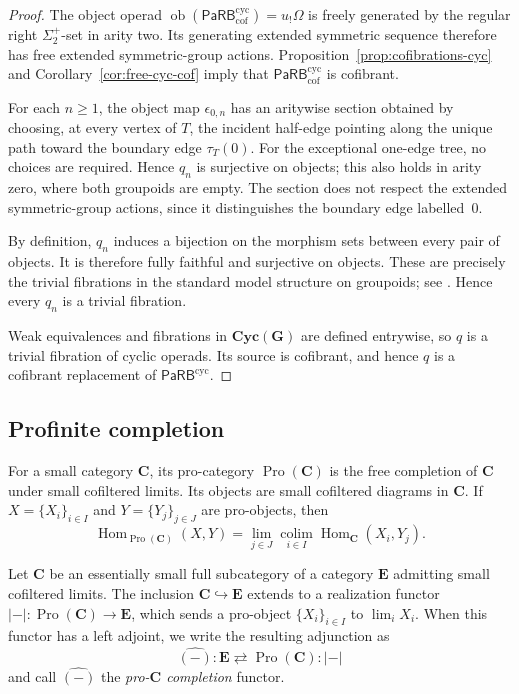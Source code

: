 \documentclass{amsart}
\newcommand{\bC}{\mathbf{C}}
\newcommand{\bE}{\mathbf{E}}
\newcommand{\Grpd}{\mathbf{G}}
\newcommand{\PaRB}{\mathsf{PaRB}}
\newcommand{\magma}{\mathsf{\Omega}}
\newcommand{\Cyc}{\mathbf{Cyc}}
\newcommand{\Pro}{\operatorname{Pro}}
\newcommand{\Hom}{\operatorname{Hom}}
\newcommand{\ob}{\operatorname{ob}}
\theoremstyle{definition}
\numberwithin{equation}{section}
\begin{document}
\begin{proof}
The object operad
$\ob(\PaRB_{\mathrm{cof}}^{\mathrm{cyc}})=u_!\magma$
is freely generated by the regular right $\Sigma_2^+$-set in arity
two. Its generating extended symmetric sequence therefore has free
extended symmetric-group actions.
Proposition~\ref{prop:cofibrations-cyc} and
Corollary~\ref{cor:free-cyc-cof} imply that
$\PaRB_{\mathrm{cof}}^{\mathrm{cyc}}$ is cofibrant.

For each $n\geq1$, the object map $\epsilon_{0,n}$ has an aritywise
section obtained by choosing, at every vertex of $T$, the incident
half-edge pointing along the unique path toward the boundary edge
$\tau_T(0)$. For the exceptional one-edge tree, no choices are
required. Hence $q_n$ is surjective on objects; this also holds in
arity zero, where both groupoids are empty. The section does not
respect the extended symmetric-group actions, since it distinguishes
the boundary edge labelled~$0$.

By definition, $q_n$ induces a bijection on the morphism sets between
every pair of objects. It is therefore fully faithful and surjective
on objects. These are precisely the trivial fibrations in the
standard model structure on groupoids; see
\cite[Section~4]{Horel_profinite_groupoids}. Hence every $q_n$ is a
trivial fibration.

Weak equivalences and fibrations in $\Cyc(\Grpd)$ are defined
entrywise, so $q$ is a trivial fibration of cyclic operads. Its source
is cofibrant, and hence $q$ is a cofibrant replacement of
$\PaRB^{\mathrm{cyc}}$.
\end{proof}
\subsection{Profinite completion}
\label{subsec: Profinite completion}

For a small category $\bC$, its pro-category $\Pro(\bC)$ is the free
completion of $\bC$ under small cofiltered limits. Its objects are
small cofiltered diagrams in $\bC$. If
$X=\{X_i\}_{i\in I}$ and $Y=\{Y_j\}_{j\in J}$ are pro-objects, then
\[
\Hom_{\Pro(\bC)}(X,Y)
=
\lim_{j\in J}\operatorname*{colim}_{i\in I}
\Hom_{\bC}(X_i,Y_j).
\]

Let $\bC$ be an essentially small full subcategory of a category
$\bE$ admitting small cofiltered limits. The inclusion
$\bC\hookrightarrow\bE$ extends to a realization functor
$|-|\colon\Pro(\bC)\to\bE$, which sends a pro-object
$\{X_i\}_{i\in I}$ to $\lim_iX_i$. When this functor has a left
adjoint, we write the resulting adjunction as
\begin{equation}
\label{profinite completion adjunction}
\widehat{(-)}\colon\bE
\rightleftarrows
\Pro(\bC):|-|
\end{equation}
and call $\widehat{(-)}$ the \emph{pro-$\bC$ completion} functor.
\end{document}
